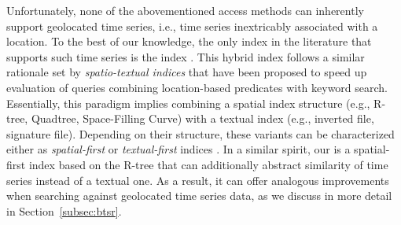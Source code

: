 Unfortunately, none of the abovementioned access methods can inherently support geolocated time series, i.e., time series inextricably associated with a location. To the best of our knowledge, the only index in the literature that supports such time series is the \btsr index \cite{chatzig17btsr}. This hybrid index follows a similar rationale set by {\em spatio-textual indices} \cite{chen2013pvldb,cong2009vldb,defelipe2008icde,chen2006sigmod} that have been proposed to speed up evaluation of queries combining location-based predicates with keyword search. Essentially, this paradigm implies combining a spatial index structure (e.g., R-tree, Quadtree, Space-Filling Curve) with a textual index (e.g., inverted file, signature file). Depending on their structure, these variants can be characterized either as {\em spatial-first} or {\em textual-first} indices \cite{christoforaki2011cikm}.
In a similar spirit, our \btsr is a spatial-first index based on the R-tree that can additionally abstract similarity of time series instead of a textual one. As a result, it can offer analogous improvements when searching against geolocated time series data, as we discuss in more detail in Section~\ref{subsec:btsr}.

